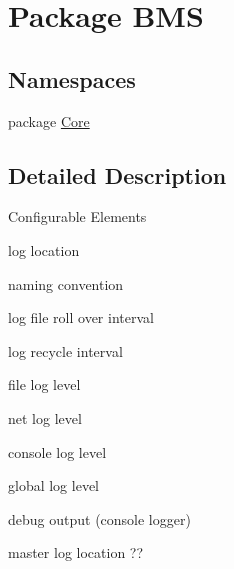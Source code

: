 \hypertarget{namespace_b_m_s}{\section{Package B\-M\-S}
\label{namespace_b_m_s}
}
\subsection*{Namespaces}
\begin{DoxyCompactItemize}
\item 
package \hyperlink{namespace_b_m_s_1_1_core}{Core}
\end{DoxyCompactItemize}


\subsection{Detailed Description}
Configurable Elements
\begin{DoxyEnumerate}
\item log location
\item naming convention
\item log file roll over interval
\item log recycle interval
\item file log level
\item net log level
\item console log level
\item global log level
\item debug output (console logger)
\item master log location ??
\item 
\end{DoxyEnumerate}